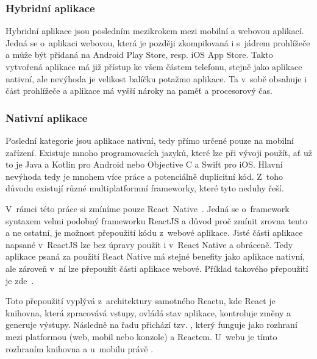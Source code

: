 \subsubsection*{Hybridní aplikace}
Hybridní aplikace jsou posledním mezikrokem mezi mobilní a webovou aplikací. Jedná se o~aplikaci webovou, která je později zkompilovaná i s~jádrem prohlížeče a může být přidaná na Android Play Store, resp. iOS App Store. Takto vytvořená aplikace má již přístup ke všem částem telefonu, stejně jako aplikace nativní, ale nevýhoda je velikost balíčku potažmo aplikace. Ta v~sobě obsahuje i část prohlížeče a aplikace má vyšší nároky na paměť a procesorový čas.

\subsubsection*{Nativní aplikace}
Poslední kategorie jsou aplikace nativní, tedy přímo určené pouze na mobilní zařízení. Existuje mnoho programovacích jazyků, které lze při vývoji použít, ať už to je Java a Kotlin pro Android nebo Objective C a Swift pro iOS. Hlavní nevýhoda tedy je mnohem více práce a potenciálně duplicitní kód. Z~toho důvodu existují různé multiplatformní frameworky, které tyto neduhy řeší.

V~rámci této práce si zmíníme pouze React~Native~\cite{facebookinc_2015_reactnative}. Jedná se o~framework syntaxem velmi podobný frameworku ReactJS a důvod proč zmínit zrovna tento a ne ostatní, je možnost přepoužití kódu z~webové aplikace. Jisté části aplikace napsané v~ReactJS lze bez úpravy použít i v~React Native a obráceně. Tedy aplikace psaná za použití React Native má stejné benefity jako aplikace nativní, ale zároveň v~ní lze přepoužít části aplikace webové. Příklad takového přepoužití je zde~\cite{sepulveda_2017_share}.

Toto přepoužití vyplývá z~architektury samotného Reactu, kde React je knihovna, která zpracovává vstupy, ovládá stav aplikace, kontroluje změny a generuje výstupy. Následně na řadu přichází tzv. , který funguje jako rozhraní mezi platformou (web, mobil nebo konzole) a Reactem. U~webu je tímto rozhraním knihovna  a u~mobilu právě .

